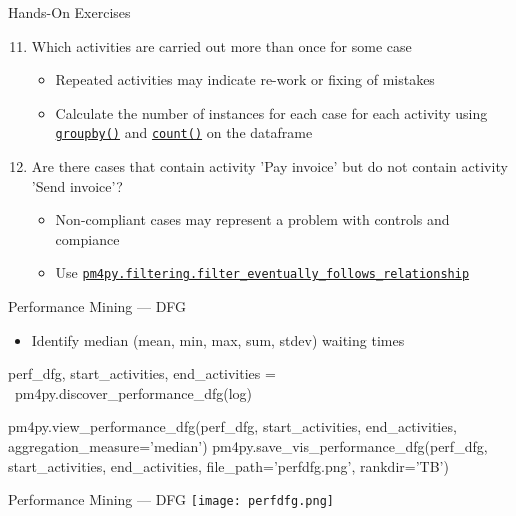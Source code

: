 \documentclass[ignorenonframetext,xcolor=x11names]{beamer}
\begin{document}
\begin{frame}{Hands-On Exercises}
\begin{enumerate}
   \setcounter{enumi}{10}
   \item Which activities are carried out more than once for some case
   \begin{itemize}
       \item Repeated activities may indicate re-work or fixing of mistakes
       \item Calculate the number of instances for each case for each activity using \href{https://pandas.pydata.org/docs/reference/api/pandas.DataFrame.groupby.html}{\texttt{groupby()}} and \href{https://pandas.pydata.org/docs/reference/api/pandas.DataFrame.count.html}{\texttt{count()}} on the dataframe
   \end{itemize}
   \item Are there cases that contain activity 'Pay invoice' but do not contain activity 'Send invoice'?
   \begin{itemize}
      \item Non-compliant cases may represent a problem with controls and compiance
      \item Use \href{https://processintelligence.solutions/static/api/2.7.11/generated/pm4py.filtering.filter_eventually_follows_relation.html}{\texttt{pm4py.filtering.filter\_eventually\_follows\_relationship}}
   \end{itemize}
\end{enumerate}
\end{frame}
   
\begin{frame}[fragile]{Performance Mining --- DFG}
\begin{itemize}
   \item Identify median (mean, min, max, sum, stdev) waiting times
\end{itemize}
\footnotesize
\begin{pythoncode}
perf_dfg, start_activities, end_activities = \
    pm4py.discover_performance_dfg(log)
    
pm4py.view_performance_dfg(perf_dfg, 
    start_activities, end_activities, 
    aggregation_measure='median')
pm4py.save_vis_performance_dfg(perf_dfg, 
    start_activities, end_activities, 
    file_path='perfdfg.png', rankdir='TB')
\end{pythoncode}
\end{frame}

\begin{frame}[fragile]{Performance Mining --- DFG}
\centering
\texttt{[image: perfdfg.png]}
\end{frame}
\end{document}
